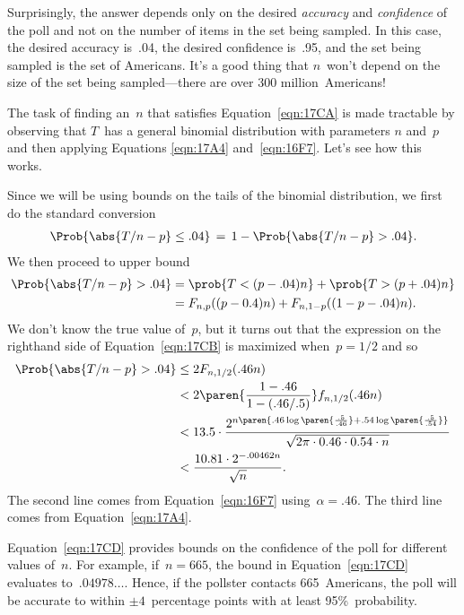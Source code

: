 Surprisingly, the answer depends only on the desired \emph{accuracy}
and \emph{confidence} of the poll and not on the number of items in
the set being sampled.  In this case, the desired accuracy is~.04, the
desired confidence is~.95, and the set being sampled is the set of
Americans.  It's a good thing that $n$~won't depend on the size of the
set being sampled---there are over 300 million~Americans!

The task of finding an~$n$ that satisfies Equation~\ref{eqn:17CA} is
made tractable by observing that $T$~has a general binomial
distribution with parameters $n$ and~$p$ and then applying Equations
\ref{eqn:17A4} and~\ref{eqn:16F7}.  Let's see how this works.

Since we will be using bounds on the tails of the binomial
distribution, we first do the standard conversion
\begin{equation*}
\Prob{\strut\abs{T/n - p} \le .04}
    \,=\, 1 - \Prob{\strut \abs{T/n - p} > .04}.
\end{equation*}
We then proceed to upper bound
\begin{align}
\Prob{\abs{T/n - p} > .04}
    & = \prob{T < (p - .04) n} + \prob{T > (p + .04) n} \notag\\
    &= F_{n, p}((p - 0.4)n) + F_{n, 1-p}((1 - p - .04) n).
        \label{eqn:17CB}
\end{align}
We don't know the true value of~$p$, but it turns out that the
expression on the righthand side of Equation~\ref{eqn:17CB} is
maximized when~$p = 1/2$ and so
\begingroup
\openup\jot
\begin{align}
\Prob{\strut \abs{T/n - p} > .04}
    &\le 2 F_{n, 1/2}(.46n) \notag\\
    &<   2 \paren{\frac{1 - .46}{1 - (.46/.5)}} f_{n, 1/2}(.46n)
        \notag\\
    &< 13.5 \cdot 
        \frac{ 2^{n \paren{.46 \log\paren{\frac{.5}{.46}}
                         + .54 \log\paren{\frac{.5}{.54}} } } }
             {\sqrt{2\pi \cdot 0.46 \cdot 0.54 \cdot n}} \notag\\
    & < \frac{ 10.81 \cdot 2^{-.00462 n} }{ \sqrt{n} }.
        \label{eqn:17CD}
\end{align}
\endgroup
The second line comes from Equation~\ref{eqn:16F7} using~$\alpha =
.46$.  The third line comes from Equation~\ref{eqn:17A4}.

Equation~\ref{eqn:17CD} provides bounds on the confidence of the poll
for different values of~$n$.  For example, if~$n = 665$, the bound in
Equation~\ref{eqn:17CD} evaluates to~$.04978\dots$.  Hence, if the
pollster contacts 665~Americans, the poll will be accurate to within
$\pm 4$~percentage points with at least 95\%~probability.

